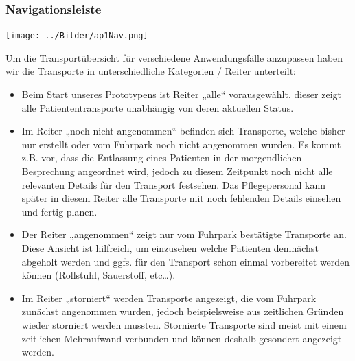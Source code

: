 \documentclass[a4paper, ngerman, 12pt]{scrartcl}
\begin{document}
\subsubsection{Navigationsleiste}
\begin{center}
\begin{minipage}{0.8\textwidth}
	\centering
	\texttt{[image: ../Bilder/ap1Nav.png]}
	\label{img:ap1nav}
\end{minipage}
\end{center}
Um die Transportübersicht für verschiedene Anwendungsfälle anzupassen haben wir die Transporte in unterschiedliche Kategorien / Reiter unterteilt:\\
\begin{itemize}
\item Beim Start unseres Prototypens ist Reiter „alle“ vorausgewählt, dieser zeigt alle Patiententransporte unabhängig von deren aktuellen Status.
\item Im Reiter „noch nicht angenommen“ befinden sich Transporte, welche bisher nur erstellt oder vom Fuhrpark noch nicht angenommen wurden. Es kommt z.B. vor, dass die Entlassung eines Patienten in der morgendlichen Besprechung angeordnet wird, jedoch zu diesem Zeitpunkt noch nicht alle relevanten Details für den Transport festsehen. Das Pflegepersonal kann später in diesem Reiter alle Transporte mit noch fehlenden Details einsehen und fertig planen. 
\item Der Reiter „angenommen“ zeigt nur vom Fuhrpark bestätigte Transporte an. Diese Ansicht ist hilfreich, um einzusehen welche Patienten demnächst abgeholt werden und ggfs. für den Transport schon einmal vorbereitet werden können (Rollstuhl, Sauerstoff, etc…). 
\item Im Reiter „storniert“ werden Transporte angezeigt, die vom Fuhrpark zunächst angenommen wurden, jedoch beispielsweise aus zeitlichen Gründen wieder storniert werden mussten. Stornierte Transporte sind meist mit einem zeitlichen Mehraufwand verbunden und können deshalb gesondert angezeigt werden.
\end{itemize}
\end{document}
